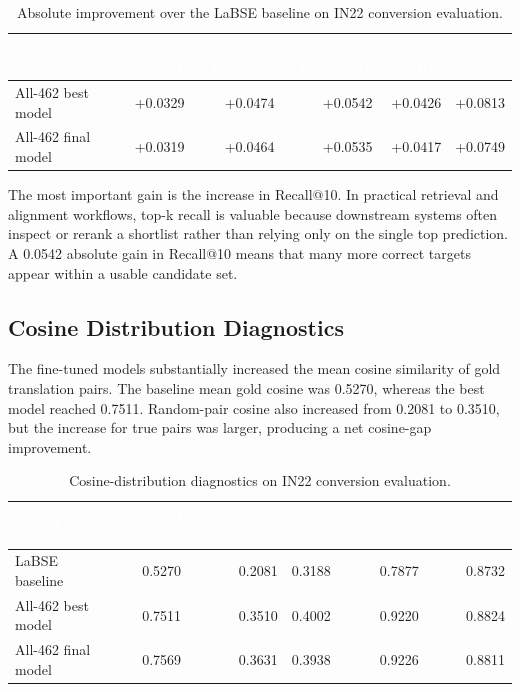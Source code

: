 \documentclass[12pt, a4paper]{article}
\begin{document}
\begin{table}[H]
\centering
\footnotesize
\renewcommand{\arraystretch}{1.25}
\begin{tabular}{p{3.3cm} r r r r r}
\toprule
\rowcolor{headerblue}
\textcolor{white}{\textbf{Model}} &
\textcolor{white}{\textbf{$\Delta$ Acc@1}} &
\textcolor{white}{\textbf{$\Delta$ Recall@5}} &
\textcolor{white}{\textbf{$\Delta$ Recall@10}} &
\textcolor{white}{\textbf{$\Delta$ MRR}} &
\textcolor{white}{\textbf{$\Delta$ Gap}} \\
\midrule
\rowcolor{rowgray}
All-462 best model & +0.0329 & +0.0474 & +0.0542 & +0.0426 & +0.0813 \\
All-462 final model & +0.0319 & +0.0464 & +0.0535 & +0.0417 & +0.0749 \\
\bottomrule
\end{tabular}
\caption{Absolute improvement over the LaBSE baseline on IN22 conversion evaluation.}
\label{tab:delta_results}
\end{table}

The most important gain is the increase in Recall@10. In practical retrieval and alignment workflows, top-k recall is valuable because downstream systems often inspect or rerank a shortlist rather than relying only on the single top prediction. A 0.0542 absolute gain in Recall@10 means that many more correct targets appear within a usable candidate set.

\subsection{Cosine Distribution Diagnostics}

The fine-tuned models substantially increased the mean cosine similarity of gold translation pairs. The baseline mean gold cosine was 0.5270, whereas the best model reached 0.7511. Random-pair cosine also increased from 0.2081 to 0.3510, but the increase for true pairs was larger, producing a net cosine-gap improvement.

\begin{table}[H]
\centering
\scriptsize
\renewcommand{\arraystretch}{1.25}
\begin{tabular}{p{3.2cm} r r r r r}
\toprule
\rowcolor{headerblue}
\textcolor{white}{\textbf{Model}} &
\textcolor{white}{\textbf{Gold Cos.}} &
\textcolor{white}{\textbf{Random Cos.}} &
\textcolor{white}{\textbf{Gap}} &
\textcolor{white}{\textbf{Sensitivity}} &
\textcolor{white}{\textbf{Specificity}} \\
\midrule
\rowcolor{rowgray}
LaBSE baseline & 0.5270 & 0.2081 & 0.3188 & 0.7877 & 0.8732 \\
All-462 best model & 0.7511 & 0.3510 & 0.4002 & 0.9220 & 0.8824 \\
\rowcolor{rowgray}
All-462 final model & 0.7569 & 0.3631 & 0.3938 & 0.9226 & 0.8811 \\
\bottomrule
\end{tabular}
\caption{Cosine-distribution diagnostics on IN22 conversion evaluation.}
\label{tab:cosine_diagnostics}
\end{table}
\end{document}
